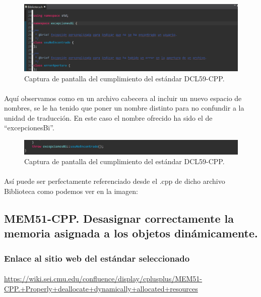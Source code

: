 			\begin{figure}[H]
				\centering
				\includegraphics[scale=0.8]{img/img1.png}
				\caption{Captura de pantalla del cumplimiento del estándar DCL59-CPP.}
				\label{img1}
			\end{figure}
			
			\paragraph{}Aquí observamos como en un archivo cabecera al incluir un nuevo espacio de nombres, se le ha tenido que poner un nombre distinto para no confundir a la unidad de traducción. En este caso el nombre ofrecido ha sido el de “excepcionesBi”.
			
			\begin{figure}[H]
				\centering
				\includegraphics[scale=0.8]{img/img2.png}
				\caption{Captura de pantalla del cumplimiento del estándar DCL59-CPP.}
				\label{img2}
			\end{figure}
			
			\paragraph{}Así puede ser perfectamente referenciado desde el .cpp de dicho archivo Biblioteca como podemos ver en la imagen:
	
	\subsection{MEM51-CPP. Desasignar correctamente la memoria asignada a los objetos dinámicamente.}
	
		\subsubsection{Enlace al sitio web del estándar seleccionado}
		
			\paragraph{}\url{https://wiki.sei.cmu.edu/confluence/display/cplusplus/MEM51-CPP.+Properly+deallocate+dynamically+allocated+resources}
		
